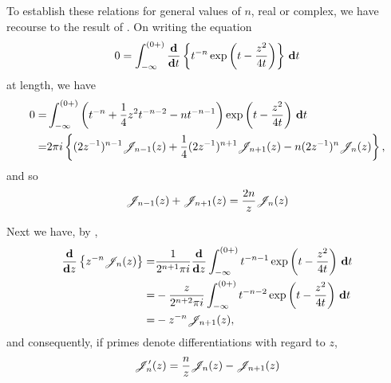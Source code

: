 To establish these relations for general values of $n$, real or
complex, we have recourse to the result of .
On writing the equation
$$
0 = \int_{-\infty}^{(0+)} \frac{\mathbf{d}}{\mathbf{d} t} \left\{  t^{-n}
  \exp\left(  t - \frac{z^{2}}{4t}   \right)   \right\} \, \mathbf{d} t
$$
at length, we have
\begin{align*}
  0 =& \int_{-\infty}^{(0+)}
  \left(  t^{-n} + \frac{1}{4}z^{2} t^{-n-2} - nt^{-n-1}   \right)
  \exp\left(  t - \frac{z^{2}}{4t}   \right)  \, \mathbf{d} t \\
  =& 2\pi i
  \left\{  (2z^{-1})^{n-1} \mathscr{J}_{n-1}(z)
    + \frac{1}{4} (2z^{-1})^{n+1} \mathscr{J}_{n+1}(z)
    - n (2z^{-1})^{n} \mathscr{J}_{n}(z) \right\},
\end{align*}
and so
\begin{equation}
  \mathscr{J}_{n-1}(z) + \mathscr{J}_{n+1}(z) = \frac{2n}{z} \mathscr{J}_{n}(z)
  \label{eq:bessel:recur}
\end{equation}

Next we have, by ,
\begin{align*}
  \frac{\mathbf{d}}{\mathbf{d} z} \left\{  z^{-n} \mathscr{J}_{n}(z)   \right\}
  =& \frac{1}{2^{n+1}\pi i}
  \frac{\mathbf{d}}{\mathbf{d} z}
  \int_{-\infty}^{(0+)}
  t^{-n-1}
  \exp\left(  t - \frac{z^{2}}{4t}  \right)
  \, \mathbf{d} t
  \\
  =& - \frac{z}{2^{n+2}\pi i}
  \int_{-\infty}^{(0+)}
  t^{-n-2}
  \exp\left(  t - \frac{z^{2}}{4t}  \right)
  \, \mathbf{d} t
  \\
  =& -z^{-n} \mathscr{J}_{n+1}(z),
\end{align*}
%
%
and consequently, if primes denote differentiations with regard to
$z$,
\begin{equation}
  \mathscr{J}'_{n}(z) = \frac{n}{z} \mathscr{J}_{n}(z) - \mathscr{J}_{n+1}(z)
  \label{eq:bessel:deriv}
\end{equation}

